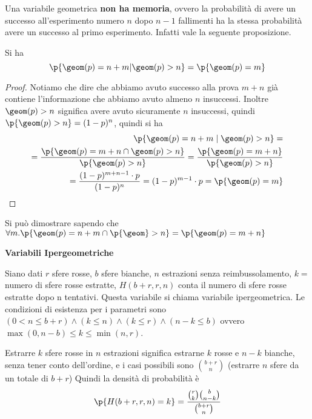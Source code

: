 Una variabile geometrica \textbf{non ha memoria}, ovvero la probabilit\`a di
	 avere un successo all'esperimento numero $ n $ dopo $n-1$ fallimenti ha la
	 stessa probabilit\`a  avere un successo al primo esperimento. Infatti vale
	 la seguente proposizione.
\begin{prop}	 
Si ha  
$$	\p{\geom(p) = n+m | \geom(p) > n} = \p{\geom(p) = m} $$
\end{prop}
\begin{proof}
    Notiamo che dire che abbiamo avuto successo alla prova $m+n$ gi\`a contiene
    l'informazione che abbiamo avuto almeno $n$ insuccessi. Inoltre $\geom(p) >
    n$ significa avere avuto sicuramente $n$ insuccessi, quindi $\p{\geom(p) >
    n}=(1-p)^n$, quindi si ha
    \begin{equation*}
        \begin{aligned}
            \p{\geom(p) = n+m \mid \geom(p) > n} =  \\
            = \dfrac{\p{\geom(p) = m + n \cap \geom(p) > n}}{\p{\geom(p) > n}} = \dfrac{\p{\geom(p) = m+n}}{\p{\geom(p) > n}}\\
            = \dfrac{(1-p)^{m+n-1} \cdot p}{(1-p)^n} = {(1-p)^{m-1} \cdot p}=\p{\geom(p) = m} \\
        \end{aligned}
    \end{equation*}
\end{proof}

    Si può dimostrare sapendo che $ \forall m . \p{\geom(p) = n+m \cap \p{\geom}
    > n} = \p{\geom(p) = m+n} $
    

\begin{defn}
    \textbf{Variabili Ipergeometriche}
    
	Siano dati $ r $ sfere rosse, $ b $ sfere bianche, $ n $ estrazioni senza
	reimbussolamento, $ k = $ numero di sfere rosse estratte, $ H(b+r, r, n) $
	conta il numero di sfere rosse estratte dopo n tentativi. Questa variabile
	si chiama variabile ipergeometrica. Le condizioni di esistenza per i
	parametri sono $ (0 < n \leq b + r) \land (k \leq n)  \land (k \leq r) \land
	(n-k \leq b) $ ovvero $\max(0,n-b)\le k \le \min(n,r)$.

    Estrarre $k$ sfere rosse in $n$ estrazioni significa estrarne $k$ rosse e
	 $n-k$ bianche, senza tener conto dell'ordine, e i casi possibili sono
	 $\binom{b+r}{n}$ (estrarre $n$ sfere da un totale di $b+r$) Quindi la
	 densit\`a  di probabilit\`a \`e
    \begin{equation*}
    \p{H(b+r, r, n) = k} = \dfrac{\binom{r}{k} \binom{b}{n-k}}{\binom{b+r}{n}}
    \end{equation*}
\end{defn}

